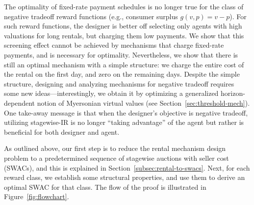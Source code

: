 \documentclass[11pt,letterpaper]{article}
\newcommand{\Inote}[1]{ {\color{blue} Inbal: #1}}
\newcommand{\swir}{stagewise-IR\xspace}
\newcommand{\fr}{fixed-rate\xspace}
\newcommand{\swac}{SWAC\xspace}
\newcommand{\swacs}{SWACs\xspace}
\theoremstyle{plain}
\begin{document}
The optimality of \fr payment schedules is no longer true for the class of negative tradeoff reward functions (e.g., consumer surplus $g(v,p) = v-p$). %
For such reward functions, the designer is better off selecting only agents with high valuations for long rentals, but charging them low payments.
We show that this screening effect cannot be achieved by mechanisms that charge fixed-rate payments,
and is necessary for optimality.
Nevertheless, we show that there is still an optimal mechanism with a simple structure:
we charge the entire cost of the rental on the first day, and zero on the remaining days.
Despite the simple structure, designing and analyzing mechanisms for negative tradeoff requires some new ideas---interestingly, we obtain it by optimizing a generalized horizon-dependent notion of Myersonian virtual values (see Section~\ref{sec:threshold-mech}).
One take-away message is that when the designer's objective is negative tradeoff, %
utilizing \swir is no longer ``taking advantage'' of the agent but rather is beneficial for both designer and agent. 


As outlined above,
our first step is to reduce the rental mechanism design problem to a predetermined sequence of stagewise auctions with seller cost (\swacs),
and this is explained in Section~\ref{subsec:rental-to-swacs}.
Next, for each reward class, we establish some structural properties, and use them to derive an optimal \swac for that class.
The flow of the proof is illustrated in Figure~\ref{fig:flowchart}.







\end{document}
